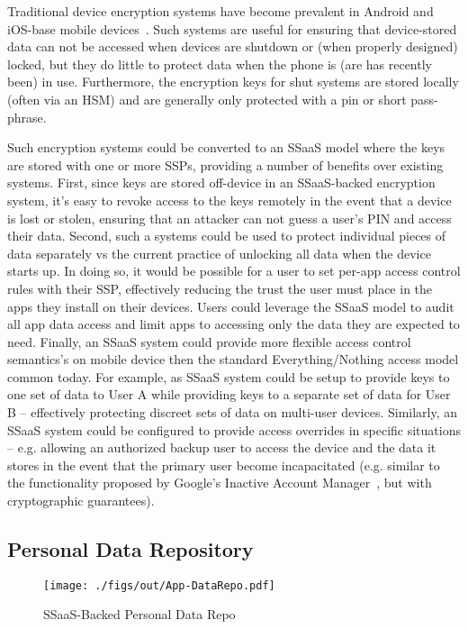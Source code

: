 Traditional device encryption systems have become prevalent in Android
and iOS-base mobile devices~\cite{ars-android-encrypt,
  ars-ios-encrypt}. Such systems are useful for ensuring that
device-stored data can not be accessed when devices are shutdown or
(when properly designed) locked, but they do little to protect data
when the phone is (are has recently been) in use. Furthermore, the
encryption keys for shut systems are stored locally (often via an HSM)
and are generally only protected with a pin or short pass-phrase.

Such encryption systems could be converted to an SSaaS model where the
keys are stored with one or more SSPs, providing a number of benefits
over existing systems. First, since keys are stored off-device in an
SSaaS-backed encryption system, it's easy to revoke access to the keys
remotely in the event that a device is lost or stolen, ensuring that
an attacker can not guess a user's PIN and access their data. Second,
such a systems could be used to protect individual pieces of data
separately vs the current practice of unlocking all data when the
device starts up. In doing so, it would be possible for a user to set
per-app access control rules with their SSP, effectively reducing the
trust the user must place in the apps they install on their
devices. Users could leverage the SSaaS model to audit all app data
access and limit apps to accessing only the data they are expected to
need. Finally, an SSaaS system could provide more flexible access
control semantics's on mobile device then the standard
Everything/Nothing access model common today. For example, as SSaaS
system could be setup to provide keys to one set of data to User A
while providing keys to a separate set of data for User B --
effectively protecting discreet sets of data on multi-user
devices. Similarly, an SSaaS system could be configured to provide
access overrides in specific situations -- e.g. allowing an authorized
backup user to access the device and the data it stores in the event
that the primary user become incapacitated (e.g. similar to the
functionality proposed by Google's Inactive Account
Manager~\cite{atlantic-google-iam}, but with cryptographic
guarantees).

\subsection{Personal Data Repository}

\begin{figure}[t]
  \centering
  \texttt{[image: ./figs/out/App-DataRepo.pdf]}
  \caption{SSaaS-Backed Personal Data Repo}
  \label{fig:apps-datarepo}
\end{figure}


